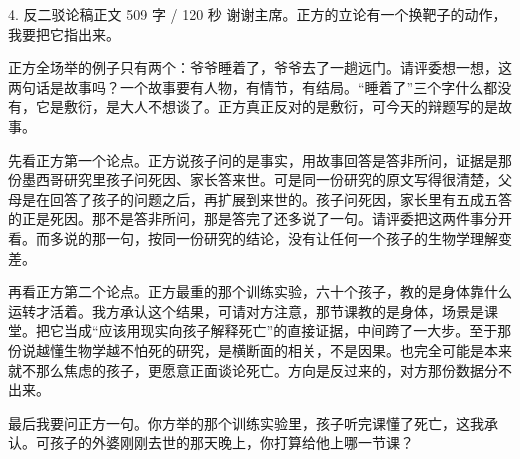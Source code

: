 \documentclass[script,con]{debate}
\begin{document}
\begin{speech}{4. 反二驳论稿}{正文 509 字 / 120 秒}
谢谢主席。正方的立论有一个换靶子的动作，我要把它指出来。

正方全场举的例子只有两个：爷爷睡着了，爷爷去了一趟远门。请评委想一想，这两句话是故事吗？一个故事要有人物，有情节，有结局。“睡着了”三个字什么都没有，它是敷衍，是大人不想谈了。正方真正反对的是敷衍，可今天的辩题写的是故事。

先看正方第一个论点。正方说孩子问的是事实，用故事回答是答非所问，证据是那份墨西哥研究里孩子问死因、家长答来世。可是同一份研究的原文写得很清楚，父母是在回答了孩子的问题之后，再扩展到来世的。孩子问死因，家长里有五成五答的正是死因。那不是答非所问，那是答完了还多说了一句。请评委把这两件事分开看。而多说的那一句，按同一份研究的结论，没有让任何一个孩子的生物学理解变差。

再看正方第二个论点。正方最重的那个训练实验，六十个孩子，教的是身体靠什么运转才活着。我方承认这个结果，可请对方注意，那节课教的是身体，场景是课堂。把它当成“应该用现实向孩子解释死亡”的直接证据，中间跨了一大步。至于那份说越懂生物学越不怕死的研究，是横断面的相关，不是因果。也完全可能是本来就不那么焦虑的孩子，更愿意正面谈论死亡。方向是反过来的，对方那份数据分不出来。

最后我要问正方一句。你方举的那个训练实验里，孩子听完课懂了死亡，这我承认。可孩子的外婆刚刚去世的那天晚上，你打算给他上哪一节课？

\begin{contingency}
\end{contingency}
\end{speech}
\end{document}
